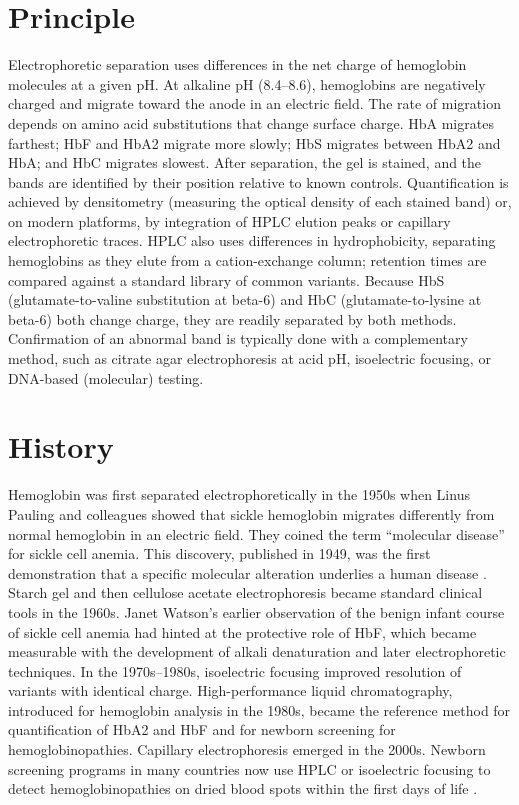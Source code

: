 \section*{Principle}
Electrophoretic separation uses differences in the net charge of hemoglobin molecules at a given pH. At alkaline pH (8.4--8.6), hemoglobins are negatively charged and migrate toward the anode in an electric field. The rate of migration depends on amino acid substitutions that change surface charge. HbA migrates farthest; HbF and HbA2 migrate more slowly; HbS migrates between HbA2 and HbA; and HbC migrates slowest. After separation, the gel is stained, and the bands are identified by their position relative to known controls. Quantification is achieved by densitometry (measuring the optical density of each stained band) or, on modern platforms, by integration of HPLC elution peaks or capillary electrophoretic traces. HPLC also uses differences in hydrophobicity, separating hemoglobins as they elute from a cation-exchange column; retention times are compared against a standard library of common variants. Because HbS (glutamate-to-valine substitution at beta-6) and HbC (glutamate-to-lysine at beta-6) both change charge, they are readily separated by both methods. Confirmation of an abnormal band is typically done with a complementary method, such as citrate agar electrophoresis at acid pH, isoelectric focusing, or DNA-based (molecular) testing.

\section*{History}
Hemoglobin was first separated electrophoretically in the 1950s when Linus Pauling and colleagues showed that sickle hemoglobin migrates differently from normal hemoglobin in an electric field. They coined the term ``molecular disease'' for sickle cell anemia. This discovery, published in 1949, was the first demonstration that a specific molecular alteration underlies a human disease \cite{pauling1949sickle}. Starch gel and then cellulose acetate electrophoresis became standard clinical tools in the 1960s. Janet Watson's earlier observation of the benign infant course of sickle cell anemia had hinted at the protective role of HbF, which became measurable with the development of alkali denaturation and later electrophoretic techniques. In the 1970s--1980s, isoelectric focusing improved resolution of variants with identical charge. High-performance liquid chromatography, introduced for hemoglobin analysis in the 1980s, became the reference method for quantification of HbA2 and HbF and for newborn screening for hemoglobinopathies. Capillary electrophoresis emerged in the 2000s. Newborn screening programs in many countries now use HPLC or isoelectric focusing to detect hemoglobinopathies on dried blood spots within the first days of life \cite{michlitsch2009newborn}.

